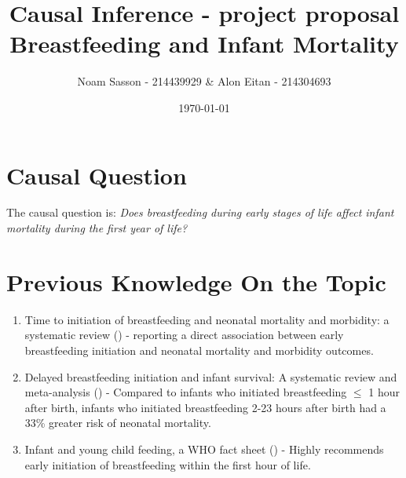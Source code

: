 \documentclass[a4paper,12pt]{article} %
\title{Causal Inference - project proposal \\ Breastfeeding and Infant Mortality} %
\author{Noam Sasson - 214439929 \& Alon Eitan - 214304693} %
\date{\today} %
\begin{document}

\maketitle %
\section{Causal Question} %
The causal question is: \textit{Does breastfeeding during early stages of life affect infant mortality during the first year of life?}
\section{Previous Knowledge On the Topic}
\begin{enumerate}
    \item Time to initiation of breastfeeding and neonatal mortality and morbidity: a systematic review (\cite{AmandaK2013}) -  reporting a direct association between early breastfeeding initiation and neonatal mortality and morbidity outcomes.
    \item Delayed breastfeeding initiation and infant survival: A systematic review and meta-analysis (\cite{EmilyR2015}) - Compared to infants who initiated breastfeeding $\leq$ 1 hour after birth, infants who initiated breastfeeding 2-23 hours after birth had a 33\% greater risk of neonatal mortality.
    \item Infant and young child feeding, a WHO fact sheet (\cite{who2021}) - Highly recommends early initiation of breastfeeding within the first hour of life.
\end{enumerate}
\end{document}
